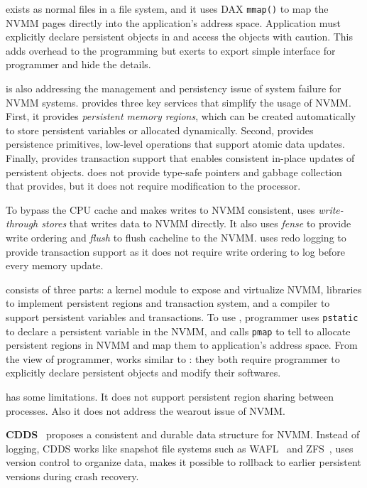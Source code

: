 \nvh{} exists as normal files in a file system, and it uses DAX
\texttt{mmap()} to map the NVMM pages directly into the application's
address space. Application must explicitly declare persistent objects in
\nvh{} and access the objects with caution. This adds overhead to the
programming but \nvh{} exerts to export simple interface for programmer
and hide the details.

\mnem{} is also addressing the management and persistency issue
of system failure for NVMM systems. \mnem{} provides three key services
that simplify the usage of NVMM. First, it provides \emph{persistent
memory regions}, which can be created automatically to store persistent 
variables or allocated dynamically. Second, \mnem{} provides persistence
primitives, low-level operations that support atomic data updates. Finally,
\mnem{} provides transaction support that enables consistent in-place
updates of persistent objects. \mnem{} does not provide type-safe pointers
and gabbage collection that \nvh{} provides, but it does not require
modification to the processor.

To bypass the CPU cache and makes writes to NVMM consistent, \mnem{} uses
\emph{write-through stores} that writes data to NVMM directly. It also
uses \emph{fense} to provide write ordering and \emph{flush} to flush
cacheline to the NVMM. \mnem{} uses redo logging to provide transaction support
as it does not require write ordering to log before every memory update.

\mnem{} consists of three parts: a kernel module to expose and virtualize NVMM, 
libraries to implement persistent regions and transaction system, and
a compiler to support persistent variables and transactions. To use \mnem{},
programmer uses \texttt{pstatic} to declare a persistent variable in the NVMM,
and calls \texttt{pmap} to tell \mnem{} to allocate persistent regions in NVMM
and map them to application's address space. From the view of programmer,
\mnem{} works similar to \nvh{}: they both require programmer to explicitly
declare persistent objects and modify their softwares.

\mnem{} has some limitations. It does not support persistent region sharing
between processes. Also it does not address the wearout issue of NVMM.

\textbf{CDDS}~\cite{cdds} proposes a consistent and durable data structure for
 NVMM.
Instead of logging, CDDS works like snapshot file systems such as
WAFL~\cite{wafl} and ZFS~\cite{zfs}, uses version control to organize data,
makes it possible to rollback to earlier persistent versions during crash
recovery.

